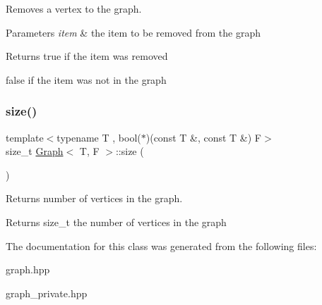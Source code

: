 Removes a vertex to the graph. 


\begin{DoxyParams}{Parameters}
{\em item} & the item to be removed from the graph \\
\hline
\end{DoxyParams}
\begin{DoxyReturn}{Returns}
true if the item was removed 

false if the item was not in the graph 
\end{DoxyReturn}
\mbox{\label{class_graph_a98ac5dfc305ed0e31b6bb160503151ba}} 
\subsubsection{\texorpdfstring{size()}{size()}}
{\footnotesize\ttfamily template$<$typename T , bool($\ast$)(const T \&, const T \&) F$>$ \\
size\+\_\+t \hyperlink{class_graph}{Graph}$<$ T, F $>$\+::size (\begin{DoxyParamCaption}{ }\end{DoxyParamCaption})}



Returns number of vertices in the graph. 

\begin{DoxyReturn}{Returns}
size\+\_\+t the number of vertices in the graph 
\end{DoxyReturn}


The documentation for this class was generated from the following files\+:\begin{DoxyCompactItemize}
\item 
graph.\+hpp\item 
graph\+\_\+private.\+hpp\end{DoxyCompactItemize}
